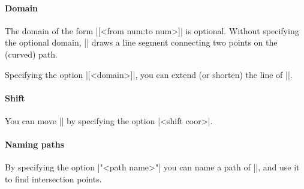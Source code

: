 \paragraph{Domain}
The domain of the form |[<from num:to num>]| is optional.
Without specifying the optional domain, |\tzsecantat| draws a line segment connecting two points on the (curved) path.

\begin{tzcode}{.3}
{}
\end{tzcode}

Specifying the option |[<domain>]|, you can extend (or shorten) the line of |\tzsecantat|.

\begin{tzcode}{.3}
\end{tzcode}

\paragraph{Shift}
You can move |\tzsecantat| by specifying the option |<shift coor>|.

\begin{tzcode}{.3}
\end{tzcode}

\paragraph{Naming paths}
By specifying the option |"<path name>"| you can name a path of |\tzsecantat|, and use it to find intersection points.

